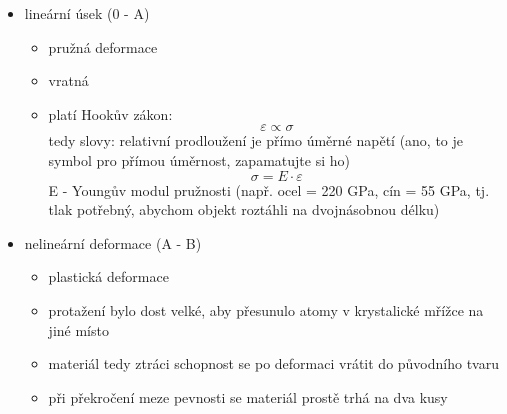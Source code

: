 \documentclass{article}
\begin{document}
      \begin{itemize}
        \item lineární úsek (0 - A)
        \begin{itemize}
          \item pružná deformace
          \item vratná
          \item platí Hookův zákon:
            \begin{equation*}
              \varepsilon \propto \sigma
            \end{equation*}
          tedy slovy: relativní prodloužení je přímo úměrné napětí (ano, to je symbol pro přímou úměrnost, zapamatujte si ho)
            \begin{equation*}
              \sigma = E\cdot\varepsilon
            \end{equation*}
          E - Youngův modul pružnosti (např. ocel = 220 GPa, cín = 55 GPa, tj. tlak potřebný, abychom objekt roztáhli na dvojnásobnou délku)
        \end{itemize}
        \item nelineární deformace (A - B)
        \begin{itemize}
          \item plastická deformace
          \item protažení bylo dost velké, aby přesunulo atomy v krystalické mřížce na jiné místo
          \item materiál tedy ztráci schopnost se po deformaci vrátit do původního tvaru
          \item při překročení meze pevnosti se materiál prostě trhá na dva kusy
        \end{itemize}
      \end{itemize}
\end{document}
